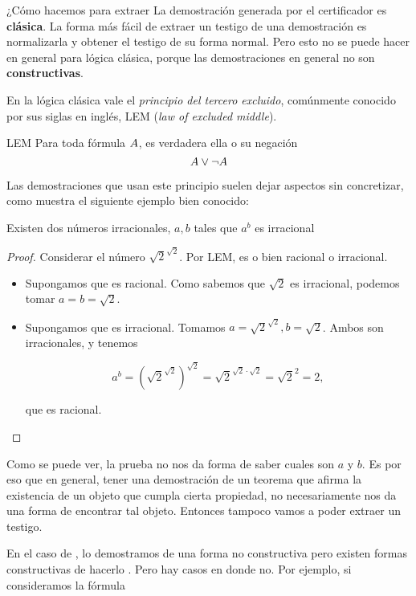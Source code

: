 ¿Cómo hacemos para extraer La demostración generada por el certificador es \textbf{clásica}. La forma más
fácil de extraer un testigo de una demostración es normalizarla y obtener el
testigo de su forma normal. Pero esto no se puede hacer en general para lógica
clásica, porque las demostraciones en general no son \textbf{constructivas}.

En la lógica clásica vale el \textit{principio del tercero excluido}, comúnmente
conocido por sus siglas en inglés, LEM (\textit{law of excluded middle}).

\begin{prop}{LEM} Para toda fórmula $A$, es verdadera ella o su negación
    \[ A \vee \neg A \]
\end{prop}

Las demostraciones que usan este principio suelen dejar aspectos sin
concretizar, como muestra el siguiente ejemplo bien conocido:

\begin{theorem}\label{thm:irrat}
    Existen dos números irracionales, $a, b$ tales que $a^b$ es irracional
\end{theorem}
\begin{proof}
    Considerar el número $\sqrt{2}^{\sqrt{2}}$. Por LEM, es o bien racional o
    irracional.
    \begin{itemize}
        \item Supongamos que es racional. Como sabemos que $\sqrt{2}$ es
        irracional, podemos tomar $a=b=\sqrt{2}$.
        \item Supongamos que es irracional. Tomamos $a = \sqrt{2}^{\sqrt{2}}, b
        = \sqrt{2}$. Ambos son irracionales, y tenemos

        \[
            a^b
            = \left( \sqrt{2}^{\sqrt{2}} \right)^{\sqrt{2}}
            = \sqrt{2}^{\sqrt{2} \cdot \sqrt{2}}
            = \sqrt{2}^{2}
            = 2,
        \]

        que es racional.
    \end{itemize}
\end{proof}

Como se puede ver, la prueba no nos da forma de saber cuales son $a$ y $b$. Es
por eso que en general, tener una demostración de un teorema que afirma la
existencia de un objeto que cumpla cierta propiedad, no necesariamente nos da
una forma de encontrar tal objeto. Entonces tampoco vamos a poder extraer un
testigo.

En el caso de , lo demostramos de una forma no constructiva pero
existen formas constructivas de hacerlo . Pero hay casos en donde
no. Por ejemplo, si consideramos la fórmula

